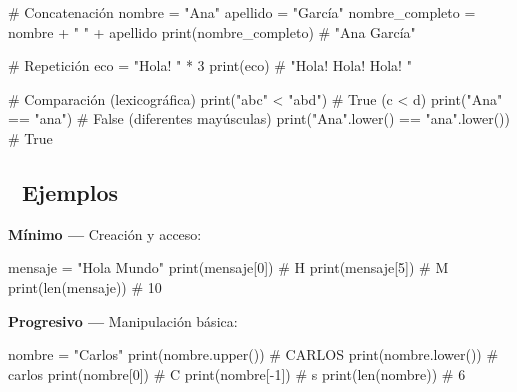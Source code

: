 \documentclass[
  doc,
  floatsintext,
  longtable,
  a4paper,
  nolmodern,
  notxfonts,
  notimes,
  12pt,
  colorlinks=true,linkcolor=blue,citecolor=blue,urlcolor=blue]{apa7}
\newenvironment{Shaded}{\begin{snugshade}}{\end{snugshade}}
\newcommand{\BuiltInTok}[1]{\textcolor[rgb]{0.00,0.23,0.31}{#1}}
\newcommand{\CommentTok}[1]{\textcolor[rgb]{0.37,0.37,0.37}{#1}}
\newcommand{\DecValTok}[1]{\textcolor[rgb]{0.68,0.00,0.00}{#1}}
\newcommand{\NormalTok}[1]{\textcolor[rgb]{0.00,0.23,0.31}{#1}}
\newcommand{\OperatorTok}[1]{\textcolor[rgb]{0.37,0.37,0.37}{#1}}
\newcommand{\StringTok}[1]{\textcolor[rgb]{0.13,0.47,0.30}{#1}}
\begin{document}
\begin{Shaded}
\begin{Highlighting}[]
\CommentTok{\# Concatenación}
\NormalTok{nombre }\OperatorTok{=} \StringTok{"Ana"}
\NormalTok{apellido }\OperatorTok{=} \StringTok{"García"}
\NormalTok{nombre\_completo }\OperatorTok{=}\NormalTok{ nombre }\OperatorTok{+} \StringTok{" "} \OperatorTok{+}\NormalTok{ apellido}
\BuiltInTok{print}\NormalTok{(nombre\_completo)  }\CommentTok{\# "Ana García"}

\CommentTok{\# Repetición}
\NormalTok{eco }\OperatorTok{=} \StringTok{"Hola! "} \OperatorTok{*} \DecValTok{3}
\BuiltInTok{print}\NormalTok{(eco)  }\CommentTok{\# "Hola! Hola! Hola! "}

\CommentTok{\# Comparación (lexicográfica)}
\BuiltInTok{print}\NormalTok{(}\StringTok{"abc"} \OperatorTok{\textless{}} \StringTok{"abd"}\NormalTok{)   }\CommentTok{\# True (c \textless{} d)}
\BuiltInTok{print}\NormalTok{(}\StringTok{"Ana"} \OperatorTok{==} \StringTok{"ana"}\NormalTok{)  }\CommentTok{\# False (diferentes mayúsculas)}
\BuiltInTok{print}\NormalTok{(}\StringTok{"Ana"}\NormalTok{.lower() }\OperatorTok{==} \StringTok{"ana"}\NormalTok{.lower())  }\CommentTok{\# True}
\end{Highlighting}
\end{Shaded}

\subsection{🔬 Ejemplos}\label{ejemplos}

\textbf{Mínimo ---} Creación y acceso:

\begin{Shaded}
\begin{Highlighting}[]
\NormalTok{mensaje }\OperatorTok{=} \StringTok{"Hola Mundo"}
\BuiltInTok{print}\NormalTok{(mensaje[}\DecValTok{0}\NormalTok{])     }\CommentTok{\# H}
\BuiltInTok{print}\NormalTok{(mensaje[}\DecValTok{5}\NormalTok{])     }\CommentTok{\# M}
\BuiltInTok{print}\NormalTok{(}\BuiltInTok{len}\NormalTok{(mensaje))   }\CommentTok{\# 10}
\end{Highlighting}
\end{Shaded}

\textbf{Progresivo ---} Manipulación básica:

\begin{Shaded}
\begin{Highlighting}[]
\NormalTok{nombre }\OperatorTok{=} \StringTok{"Carlos"}
\BuiltInTok{print}\NormalTok{(nombre.upper())  }\CommentTok{\# CARLOS}
\BuiltInTok{print}\NormalTok{(nombre.lower())  }\CommentTok{\# carlos}
\BuiltInTok{print}\NormalTok{(nombre[}\DecValTok{0}\NormalTok{])       }\CommentTok{\# C}
\BuiltInTok{print}\NormalTok{(nombre[}\OperatorTok{{-}}\DecValTok{1}\NormalTok{])      }\CommentTok{\# s}
\BuiltInTok{print}\NormalTok{(}\BuiltInTok{len}\NormalTok{(nombre))     }\CommentTok{\# 6}
\end{Highlighting}
\end{Shaded}
\end{document}
